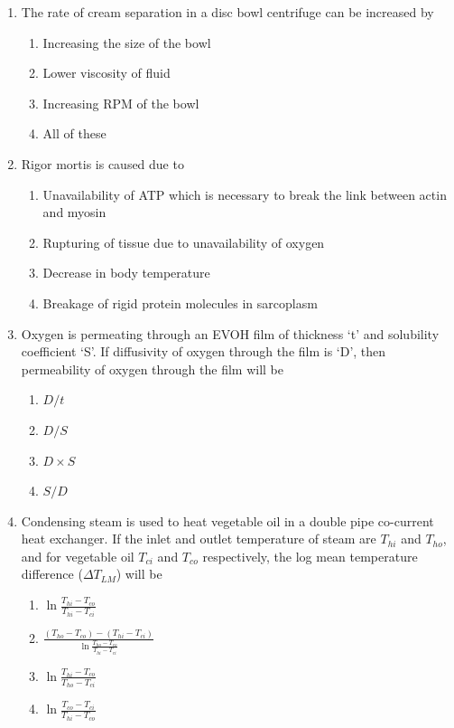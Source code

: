 \documentclass[journal,12pt,onecolumn]{IEEEtran}
\begin{document}
\begin{enumerate}[label=\arabic*.]
\item The rate of cream separation in a disc bowl centrifuge can be increased by

\begin{multicols}{2}
\begin{enumerate}[label=(\Alph*)]
\item Increasing the size of the bowl
\item Lower viscosity of fluid
\item Increasing RPM of the bowl
\item All of these
\end{enumerate}
\end{multicols}

\item Rigor mortis is caused due to

\begin{enumerate}[label=(\Alph*)]
\item Unavailability of ATP which is necessary to break the link between actin and myosin
\item Rupturing of tissue due to unavailability of oxygen
\item Decrease in body temperature
\item Breakage of rigid protein molecules in sarcoplasm
\end{enumerate}

\item Oxygen is permeating through an EVOH film of thickness ‘t’ and solubility coefficient ‘S’. If diffusivity of oxygen through the film is ‘D’, then permeability of oxygen through the film will be

\begin{multicols}{4}
\begin{enumerate}[label=(\Alph*)]
\item $D/t$
\item $D/S$
\item $D \times S$
\item $S/D$
\end{enumerate}
\end{multicols}

\item Condensing steam is used to heat vegetable oil in a double pipe co-current heat exchanger. If the inlet and outlet temperature of steam are $T_{hi}$ and $T_{ho}$, and for vegetable oil $T_{ci}$ and $T_{co}$ respectively, the log mean temperature difference ($\Delta T_{LM}$) will be

\begin{multicols}{4}
\begin{enumerate}[label=(\Alph*)]
\item $\ln \frac{T_{hi} - T_{co}}{T_{hi} - T_{ci}}$
\item $\frac{(T_{ho} - T_{co}) - (T_{hi} - T_{ci})}{\ln \frac{T_{ho} - T_{co}}{T_{hi} - T_{ci}}}$
\item $\ln \frac{T_{hi} - T_{co}}{T_{ho} - T_{ci}}$
\item $\ln \frac{T_{co} - T_{ci}}{T_{hi} - T_{co}}$
\end{enumerate}
\end{multicols}


\end{enumerate}
\end{document}
